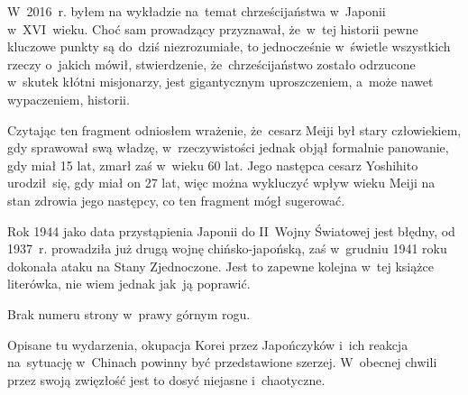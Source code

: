 \documentclass[a4paper,11pt]{article}
\numberwithin{equation}{section}
\begin{document}
\VerSpaceFour





\noindent
{}

\VerSpaceFour





\noindent
{} W~2016~r. byłem na wykładzie na~temat chrześcijaństwa w~Japonii
w~XVI~wieku. Choć sam prowadzący przyznawał, że~w~tej historii pewne
kluczowe punkty są do~dziś niezrozumiałe, to jednocześnie w~świetle
wszystkich rzeczy o~jakich mówił, stwierdzenie, że~chrześcijaństwo zostało
odrzucone w~skutek kłótni misjonarzy, jest gigantycznym uproszczeniem,
a~może nawet wypaczeniem, historii.

\VerSpaceFour





\noindent
{} Czytając ten fragment odniosłem wrażenie, że~cesarz Meiji był
stary człowiekiem, gdy sprawował swą władzę, w~rzeczywistości jednak objął
formalnie panowanie, gdy miał 15 lat, zmarł zaś w~wieku 60 lat. Jego
następca cesarz Yoshihito urodził~się, gdy miał on 27 lat, więc można
wykluczyć wpływ wieku Meiji na stan zdrowia jego następcy, co ten fragment
mógł sugerować.

\VerSpaceFour





\noindent
{}

\VerSpaceFour





\noindent
{} Rok 1944 jako data przystąpienia Japonii do II~Wojny Światowej
jest błędny, od 1937~r. prowadziła już drugą wojnę chińsko-japońską, zaś
w~grudniu 1941 roku dokonała ataku na Stany Zjednoczone. Jest to zapewne
kolejna w~tej książce literówka, nie wiem jednak jak~ją poprawić.

\VerSpaceFour





\noindent
{} Brak numeru strony w~prawy górnym rogu.

\VerSpaceFour





\noindent
{} Opisane tu wydarzenia, okupacja Korei przez Japończyków i~ich
reakcja na~sytuację w~Chinach powinny być przedstawione szerzej. W~obecnej
chwili przez swoją zwięzłość jest to dosyć niejasne i~chaotyczne.
\end{document}
